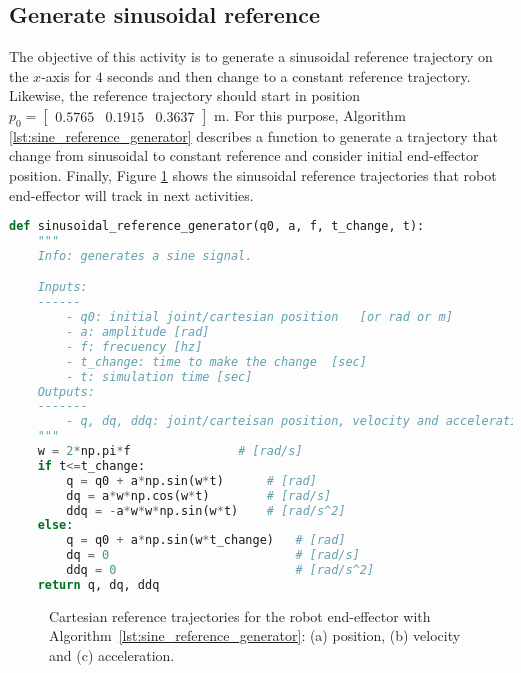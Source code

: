 \graphicspath{{images/act_1.1/}}
\subsection{Generate sinusoidal reference}
\label{subsec:generate_sinusoidal_reference}
The objective of this activity is to generate a sinusoidal reference trajectory on the $x$-axis for $4$ seconds and then change to a constant reference trajectory. Likewise, the reference trajectory should start in position $p_0=\begin{bmatrix}  0.5765 &   0.1915 &   0.3637 \end{bmatrix}$ m. For this purpose, Algorithm \ref{lst:sine_reference_generator} describes a function to generate a trajectory that change from sinusoidal to constant reference and consider initial end-effector position. Finally, Figure \ref{fig:act_1.1_sin_reference} shows the sinusoidal reference trajectories that robot end-effector will track in next activities. \vspace{.5cm}

\begin{lstlisting}[language=Python,caption=Function to generate a sinusoidal reference trajectory for some seconds and then change to a constant reference trajectory., label={lst:sine_reference_generator}]
def sinusoidal_reference_generator(q0, a, f, t_change, t):
    """
    Info: generates a sine signal.

    Inputs: 
    ------
        - q0: initial joint/cartesian position   [or rad or m]
        - a: amplitude [rad]
        - f: frecuency [hz]
        - t_change: time to make the change  [sec]
        - t: simulation time [sec]
    Outputs:
    -------
        - q, dq, ddq: joint/carteisan position, velocity and acceleration
    """
    w = 2*np.pi*f               # [rad/s]
    if t<=t_change:
        q = q0 + a*np.sin(w*t)      # [rad]
        dq = a*w*np.cos(w*t)        # [rad/s]
        ddq = -a*w*w*np.sin(w*t)    # [rad/s^2]
    else:
        q = q0 + a*np.sin(w*t_change)   # [rad]
        dq = 0                          # [rad/s]
        ddq = 0                         # [rad/s^2]
    return q, dq, ddq
\end{lstlisting}

\vspace*{0cm}
\begin{figure}
	\centering
	\hfill
	\hfill
	\caption{Cartesian reference trajectories for the robot end-effector with Algorithm~\ref{lst:sine_reference_generator}: (a) position, (b) velocity and (c) acceleration.}
	\label{fig:act_1.1_sin_reference}
\end{figure}
